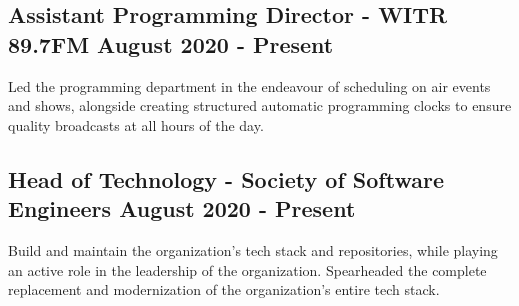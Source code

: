 \documentclass[11pt, letterpaper]{article}
\begin{document}
        \subsection{Assistant Programming Director - WITR 89.7FM \hfill August 2020 - Present}
            Led the programming department in the endeavour of scheduling on air events and shows, alongside 
            creating structured automatic programming clocks to ensure quality broadcasts at all hours of the day.

        \subsection{Head of Technology - Society of Software Engineers \hfill August 2020 - Present}
            Build and maintain the organization's tech stack and repositories, while playing an active role 
            in the leadership of the organization. Spearheaded the complete replacement and modernization of 
            the organization's entire tech stack.
\end{document}
